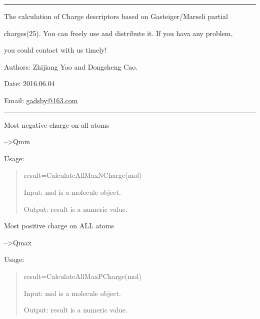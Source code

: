 \documentclass[letterpaper,10pt,english]{sphinxmanual}
\begin{document}
\bigskip\hrule{}\bigskip


The calculation of Charge descriptors based on Gasteiger/Marseli partial

charges(25). You can freely use and distribute it. If you hava  any problem,

you could contact with us timely!

Authors: Zhijiang Yao and Dongsheng Cao.

Date: 2016.06.04

Email: \href{mailto:gadsby@163.com}{gadsby@163.com}


\bigskip\hrule{}\bigskip


\begin{fulllineitems}
\label{reference/charge:charge.CalculateAllMaxNCharge}
Most negative charge on all atoms

--\textgreater{}Qmin

Usage:
\begin{quote}

result=CalculateAllMaxNCharge(mol)

Input: mol is a molecule object.

Output: result is a numeric value.
\end{quote}

\end{fulllineitems}


\begin{fulllineitems}
\label{reference/charge:charge.CalculateAllMaxPCharge}
Most positive charge on ALL atoms

--\textgreater{}Qmax

Usage:
\begin{quote}

result=CalculateAllMaxPCharge(mol)

Input: mol is a molecule object.

Output: result is a numeric value.
\end{quote}

\end{fulllineitems}

\end{document}
